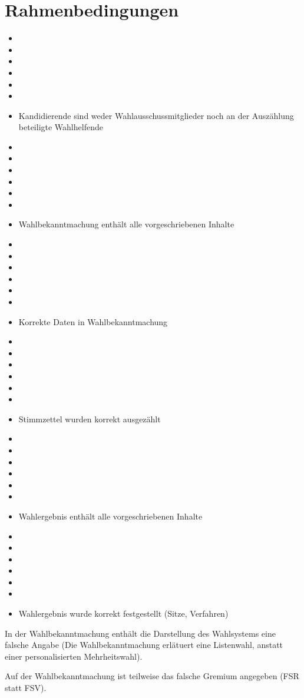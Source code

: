\documentclass[a4paper]{scrartcl}
\newcommand{\fullcheck}{\raisebox{-.8\dp\strutbox}{\texttt{[image: Check.pdf]}}}
\newcommand{\semicheck}{\raisebox{-.8\dp\strutbox}{\texttt{[image: Semicheck.pdf]}}}
\newcommand{\nocheck}{\raisebox{-.8\dp\strutbox}{\texttt{[image: Nocheck.pdf]}}}
\newcommand{\dontknow}{\raisebox{-.8\dp\strutbox}{\texttt{[image: Dontknow.pdf]}}}
\newcommand{\notrev}{\raisebox{-.8\dp\strutbox}{\texttt{[image: Notrev.pdf]}}}
\newcommand{\sym}[1]{
\ifcase#1 \item[$\Box$]
\or \item[\fullcheck]
\or \item[\semicheck]
\or \item[\nocheck]
\or \item[\dontknow]
\or \item[\notrev]
\else \item[$\Box$]
\fi}
\begin{document}


\section{Rahmenbedingungen}
\begin{itemize}[label=$\Box$]

\sym{1} Kandidierende sind weder Wahlausschussmitglieder noch an der Auszählung beteiligte Wahlhelfende
\sym{3} Wahlbekanntmachung enthält alle vorgeschriebenen Inhalte
\sym{3} Korrekte Daten in Wahlbekanntmachung
\sym{1} Stimmzettel wurden korrekt ausgezählt
\sym{1} Wahlergebnis enthält alle vorgeschriebenen Inhalte
\sym{1} Wahlergebnis wurde korrekt festgestellt (Sitze, Verfahren)
\end{itemize}




 In der Wahlbekanntmachung enthält die Darstellung des Wahlsystems eine falsche Angabe (Die Wahlbekanntmachung erlätuert eine Listenwahl, anstatt einer personalisierten Mehrheitswahl).

Auf der Wahlbekanntmachung ist teilweise das falsche Gremium angegeben (FSR statt FSV).




\end{document}
